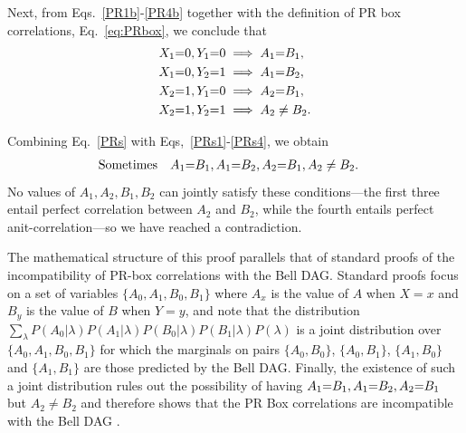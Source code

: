 Next, from Eqs.~\eqref{PR1b}-\eqref{PR4b} together with  the definition of PR box correlations, Eq.~\eqref{eq:PRbox}, we conclude that 
\begin{align} 
&X_1 \mathord{=} 0, Y_1 \mathord{=} 0 \implies A_1\mathord{=} B_1 \label{PRs1},\\
&X_1 \mathord{=} 0, Y_2 \mathord{=} 1 \implies A_1\mathord{=} B_2 \label{PRs2},\\
&X_2 \mathord{=} 1, Y_1 \mathord{=} 0 \implies A_2\mathord{=} B_1 \label{PRs3},\\
&X_2 \mathord{=} 1, Y_2 \mathord{=} 1 \implies A_2\ne B_2 \label{PRs4}.
\end{align}

Combining Eq.~\eqref{PRs} with Eqs,~\eqref{PRs1}-\eqref{PRs4}, we obtain
\begin{align}
\text{Sometimes} \quad &A_1\mathord{=} B_1, A_1\mathord{=} B_2, A_2\mathord{=} B_1, A_2\ne B_2.
\end{align} 
No values of $A_1, A_2, B_1, B_2$ can jointly satisfy these conditions---the first three entail perfect correlation between $A_2$ and $B_2$, while the fourth entails perfect anit-correlation---so we have reached a contradiction.


The mathematical structure of this proof parallels that of standard proofs of the incompatibility of PR-box correlations with the Bell DAG.  Standard proofs focus on a set of variables $\{A_0, A_1, B_0, B_1\}$ where $A_x$  is the value of $A$ when $X=x$ and $B_y$  is the value of $B$ when $Y=y$, and note that  the distribution
 $\sum_{\lambda} P(A_0|\lambda)P(A_1|\lambda)P(B_0|\lambda)P(B_1|\lambda)P(\lambda)$
 is a joint distribution over $\{A_0, A_1, B_0, B_1\}$ for which the marginals on pairs  $\{ A_0, B_0\}$, $\{ A_0, B_1\}$, $\{ A_1, B_0\}$ and $\{ A_1, B_1\}$ are those predicted by the Bell DAG.  Finally, the existence of such a joint distribution rules out the possibility of having $A_1\mathord{=} B_1, A_1\mathord{=} B_2, A_2\mathord{=} B_1$ but $ A_2\ne B_2$ and therefore shows that the PR Box correlations are incompatible with the Bell DAG \cite{LSW,roberts_thesis}.

